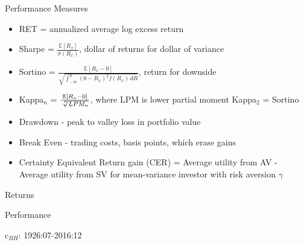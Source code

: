 \documentclass{beamer}
\begin{document}
\begin{frame}{Performance Measures}
	\begin{itemize}[<+->]
		\item RET = annualized average log excess return
		\item Sharpe = $\frac{\mathbb{E}[R_{x}]}{\sigma(R_{x})}$, dollar of returns for dollar of variance
		\item Sortino = $\frac{\mathbb{E}[R_{x} - 0]}{\sqrt  {\int _{{-\infty }}^{0}(0-R_{x})^{2}f(R_{x})\,dR}}$, return for downside
		\item Kappa$_{n}$ = $\frac{\mathbb{E}[R_{x} - 0]}{\sqrt[\leftroot{-2}\uproot{2}n]{LPM_{n}}}$, where LPM is lower partial moment Kappa$_{2}$ = Sortino
		\item Drawdown - peak to valley loss in portfolio value
		\item Break Even - trading costs, basis points, which erase gains
		\item Certainty Equivalent Return gain (CER) = Average utility from AV - Average utility from SV for mean-variance investor with risk aversion $\gamma$
	\end{itemize}
\end{frame}

\begin{frame}{Returns}
	\begin{adjustbox}{width=\textwidth,height=.8\textheight}
		
	\end{adjustbox}
\end{frame}
\begin{frame}{Performance}
	\begin{center}
		c$_{BH}$: 1926:07-2016:12
	\end{center}
	\vspace{-12pt}
	\begin{adjustbox}{width=\textwidth}
		
	\end{adjustbox}
\end{frame}
\end{document}

